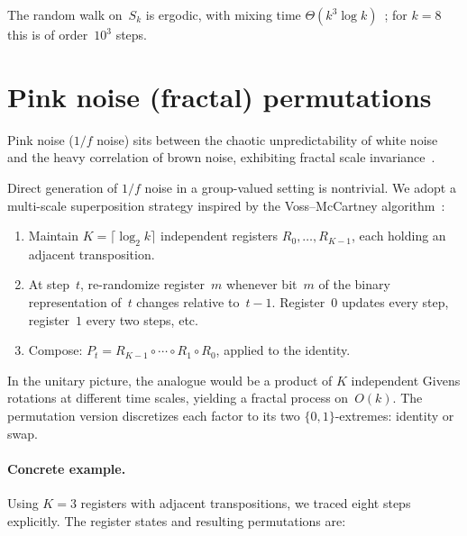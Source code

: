 \documentclass[
  twocolumn,
  aps,
  pra,
  showkeys,
  amsmath,amssymb,
  longbibliography
]{revtex4-2}
\begin{document}
The random walk on~$S_k$ is ergodic, with mixing time
$\Theta(k^3\log k)$~\cite{diaconis-shahshahani-81}; for
$k=8$ this is of order~$10^3$ steps.

\section{Pink noise (fractal) permutations}
\label{sec:pink}

Pink noise ($1/f$ noise) sits between the chaotic
unpredictability of white noise and the heavy correlation of
brown noise, exhibiting fractal scale
invariance~\cite{voss-clarke-75,voss-clarke-78}.

Direct generation of $1/f$ noise in a group-valued setting is
nontrivial.
We adopt a multi-scale superposition strategy inspired by the
Voss--McCartney algorithm~\cite{voss-clarke-78,gardner-78}:
\begin{enumerate}
\item Maintain $K=\lceil\log_2 k\rceil$ independent
      registers $R_0,\ldots,R_{K-1}$, each holding an
      adjacent transposition.
\item At step~$t$, re-randomize register~$m$ whenever bit~$m$
      of the binary representation of~$t$ changes relative
      to~$t{-}1$.
      Register~$0$ updates every step, register~$1$ every
      two steps, etc.
\item Compose: $P_t = R_{K-1}\circ\cdots\circ R_1\circ R_0$,
      applied to the identity.
\end{enumerate}

In the unitary picture, the analogue would be a product of
$K$ independent Givens rotations at different time scales,
yielding a fractal process on~$O(k)$.
The permutation version discretizes each factor to its two
$\{0,1\}$-extremes: identity or swap.

\paragraph*{Concrete example.}
Using $K=3$ registers with adjacent transpositions, we traced
eight steps explicitly.
The register states and resulting permutations are:
\end{document}

